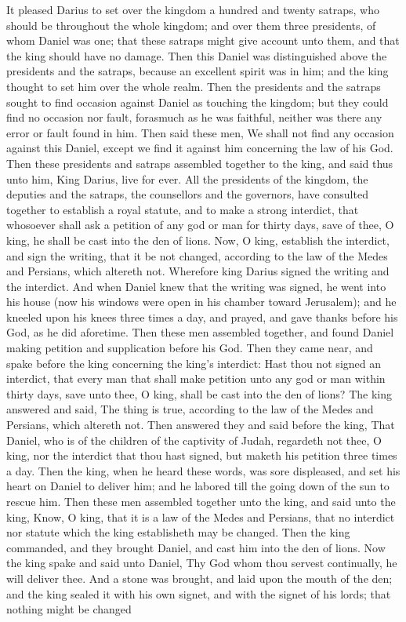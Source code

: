 It pleased Darius to set over the kingdom a hundred and twenty satraps, who should be throughout the whole kingdom; and over them three presidents, of whom Daniel was one; that these satraps might give account unto them, and that the king should have no damage. Then this Daniel was distinguished above the presidents and the satraps, because an excellent spirit was in him; and the king thought to set him over the whole realm.  Then the presidents and the satraps sought to find occasion against Daniel as touching the kingdom; but they could find no occasion nor fault, forasmuch as he was faithful, neither was there any error or fault found in him. Then said these men, We shall not find any occasion against this Daniel, except we find it against him concerning the law of his God. Then these presidents and satraps assembled together to the king, and said thus unto him, King Darius, live for ever. All the presidents of the kingdom, the deputies and the satraps, the counsellors and the governors, have consulted together to establish a royal statute, and to make a strong interdict, that whosoever shall ask a petition of any god or man for thirty days, save of thee, O king, he shall be cast into the den of lions. Now, O king, establish the interdict, and sign the writing, that it be not changed, according to the law of the Medes and Persians, which altereth not. Wherefore king Darius signed the writing and the interdict.  And when Daniel knew that the writing was signed, he went into his house (now his windows were open in his chamber toward Jerusalem); and he kneeled upon his knees three times a day, and prayed, and gave thanks before his God, as he did aforetime. Then these men assembled together, and found Daniel making petition and supplication before his God. Then they came near, and spake before the king concerning the king’s interdict: Hast thou not signed an interdict, that every man that shall make petition unto any god or man within thirty days, save unto thee, O king, shall be cast into the den of lions? The king answered and said, The thing is true, according to the law of the Medes and Persians, which altereth not. Then answered they and said before the king, That Daniel, who is of the children of the captivity of Judah, regardeth not thee, O king, nor the interdict that thou hast signed, but maketh his petition three times a day. Then the king, when he heard these words, was sore displeased, and set his heart on Daniel to deliver him; and he labored till the going down of the sun to rescue him. Then these men assembled together unto the king, and said unto the king, Know, O king, that it is a law of the Medes and Persians, that no interdict nor statute which the king establisheth may be changed.  Then the king commanded, and they brought Daniel, and cast him into the den of lions. Now the king spake and said unto Daniel, Thy God whom thou servest continually, he will deliver thee. And a stone was brought, and laid upon the mouth of the den; and the king sealed it with his own signet, and with the signet of his lords; that nothing might be changed 